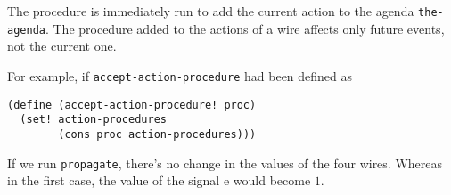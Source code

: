 \documentclass[a4paper,12pt]{article}
\begin{document}
The procedure is immediately run to add the current action to the
agenda \lstinline!the-agenda!.  The procedure added to the actions of a
wire affects only future events, not the current one.

For example, if \lstinline!accept-action-procedure! had been defined
as
\begin{lstlisting}
(define (accept-action-procedure! proc)
  (set! action-procedures
        (cons proc action-procedures)))
\end{lstlisting}
If we run \lstinline!propagate!, there's no change in the values of
the four wires.  Whereas in the first case, the value of the signal e
would become $1$.
\end{document}
